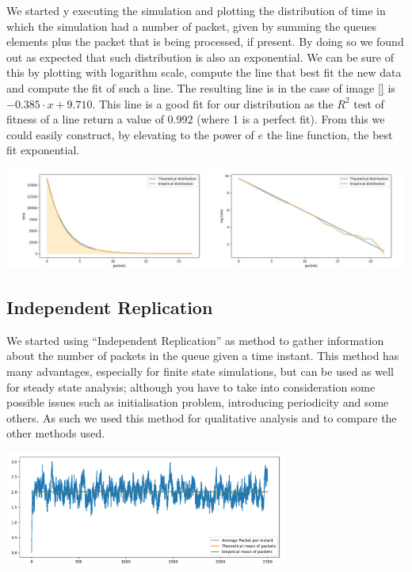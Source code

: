 \documentclass[10pt,a4paper]{article}
\begin{document}
We started y executing the simulation and plotting the distribution of time in which the simulation had a number of packet, given by summing the queues elements plus the packet that is being processed, if present. By doing so we found out as expected that such distribution is also an exponential. We can be sure of this by plotting with logarithm scale, compute the line that best fit the new data and compute the fit of such a line. The resulting line is in the case of image \ref{} is \(-0.385 \cdot x +  9.710\). This line is a good fit for our distribution as the \(R^2\) test of fitness of a line return a value of 0.992 (where 1 is a perfect fit).
From this we could easily construct, by elevating to the power of \(e\) the line function, the best fit exponential.
\begin{center}
	\includegraphics[width=\textwidth]{img/time-with-fixed-packet-n.png}
	\label{fig:time-with-fixed-packet-n}
\end{center}


\subsection*{Independent Replication}

We started using ``Independent Replication'' as method to gather information about the number of packets in the queue given a time instant. This method has many advantages, especially for finite state simulations, but can be used as well for steady state analysis; although you have to take into consideration some possible issues such as initialisation problem, introducing periodicity and some others. As such we used this method for qualitative analysis and to compare the other methods used.

\begin{center}
	\includegraphics[width=0.7\textwidth]{independent-replication-with-bias.png}
	\label{fig:independent-replication-with-bias}
\end{center}
\end{document}
